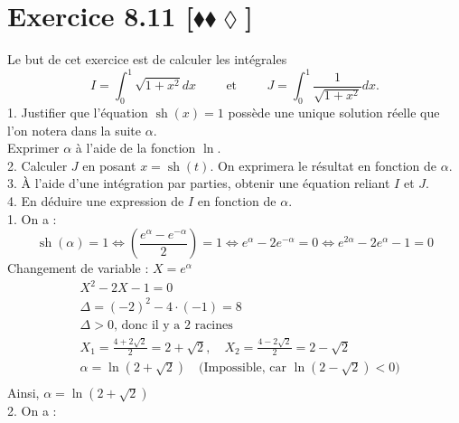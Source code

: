 \documentclass[10pt]{article}
\DeclareMathOperator{\sh}{sh}
\begin{document}

\section*{Exercice 8.11 [$\blacklozenge\blacklozenge\lozenge$]}
\begin{tcolorbox}[enhanced, width=7in, center, size=fbox, fontupper=\large, drop shadow southwest]
    Le but de cet exercice est de calculer les intégrales
    \begin{equation*}
        I = \int_0^1{\sqrt{1+x^2}dx} \hspace{1cm} \text{et} \hspace{1cm} J=\int_0^1{\frac{1}{\sqrt{1+x^2}}dx}.
    \end{equation*}
    1. Justifier que l'équation $\sh(x)=1$ possède une unique solution réelle que l'on notera dans la suite $\alpha$.\\
    Exprimer $\alpha$ à l'aide de la fonction $\ln$.\\
    2. Calculer $J$ en posant $x=\sh(t)$. On exprimera le résultat en fonction de $\alpha$.\\
    3. À l'aide d'une intégration par parties, obtenir une équation reliant $I$ et $J$.\\
    4. En déduire une expression de $I$ en fonction de $\alpha$.
    \\
    1. On a :
    \begin{equation*}
        \sh(\alpha) = 1 \iff \left( \frac{e^\alpha - e^{-\alpha}}{2} \right) = 1 \iff e^\alpha - 2e^{-\alpha} = 0 \iff e^{2\alpha} - 2e^\alpha - 1 = 0
    \end{equation*}
    Changement de variable : $X = e^\alpha$
    \begin{align*}
        &X^2 - 2X - 1 = 0 \\
        &\Delta = (-2)^2 - 4 \cdot (-1) = 8 \\
        &\Delta > 0 \text{, donc il y a 2 racines} \\
        &X_1 = \frac{4 + 2\sqrt{2}}{2} = 2 + \sqrt{2}, \quad X_2 = \frac{4 - 2\sqrt{2}}{2} = 2-\sqrt{2} \\
        &\alpha = \ln(2 + \sqrt{2}) \quad \text{(Impossible, car } \ln(2 - \sqrt{2}) < 0) \\
    \end{align*}
    Ainsi, $\alpha=\ln(2+\sqrt{2})$\\
    2. On a :
    \begin{equation*}

\end{equation*}
\end{tcolorbox}
\end{document}
